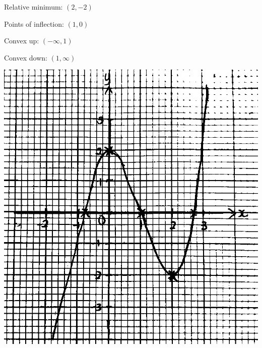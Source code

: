 \begin{vwcol}[widths={0.5,0.5},justify=flush,rule=0pt,indent=1em]
    \noindent Relative minimum: $(2, -2)$

    \noindent Points of inflection: $(1, 0)$

    \noindent Convex up: $(-\infty, 1)$

    \noindent Convex down: $(1, \infty)$

    \pagebreak

    \vspace*{4cm}

    \includegraphics[scale=0.3]{assets/28-graph.jpeg}
\end{vwcol}
